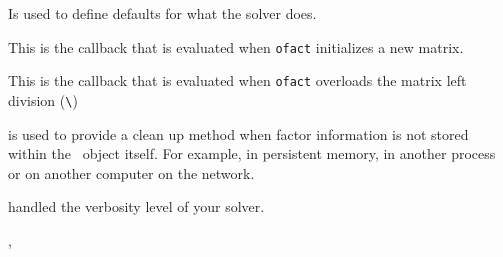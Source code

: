 
Is used to define defaults for what the solver does. 


This is the callback that is evaluated when {\tt ofact} initializes a new matrix.


This is the callback that is evaluated when {\tt ofact} overloads the matrix left division ({\tt \verb+\+})


 is used to provide a clean up method when factor information is not stored within the \ofact\ object itself. For example, in persistent memory, in another process or on another computer on the network.


 handled the verbosity level of your solver.


\begin{SDT}
 \feeig, \fereduc
\end{SDT}
\begin{OPENFEM}
 \feeig
\end{OPENFEM}


